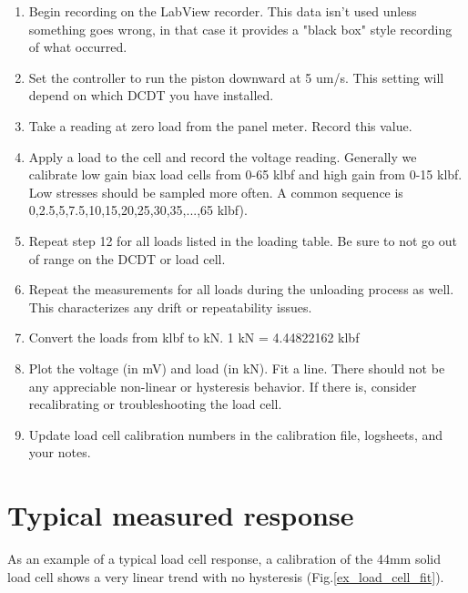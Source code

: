 \begin{enumerate}
\item Begin recording on the LabView recorder. This data isn't used unless something
    goes wrong, in that case it provides a "black box" style recording of what
    occurred. 
    
\item Set the controller to run the piston downward at 5 um/s. This setting will
     depend on which DCDT you have installed.
     
\item Take a reading at zero load from the panel meter. Record this value.

\item Apply a load to the cell and record the voltage reading. Generally we calibrate low gain biax load cells from 0-65 klbf and high gain from 0-15 klbf. Low stresses should be sampled more often. A common sequence is 0,2.5,5,7.5,10,15,20,25,30,35,...,65 klbf).

\item Repeat step 12 for all loads listed in the loading table. Be sure to not 
     go out of range on the DCDT or load cell.
     
\item Repeat the measurements for all loads during the unloading process as well.
     This characterizes any drift or repeatability issues.
     
\item Convert the loads from klbf to kN. 1 kN = 4.44822162 klbf 

\item Plot the voltage (in mV) and load (in kN). Fit a line. There should not
     be any appreciable non-linear or hysteresis behavior. If there is, consider
     recalibrating or troubleshooting the load cell.

\item Update load cell calibration numbers in the calibration file, logsheets, and your notes.
\end{enumerate}


\section{Typical measured response}

As an example of a typical load cell response, a calibration of the 44mm solid load cell shows a very linear trend with no hysteresis (Fig.\ref{ex_load_cell_fit}).

